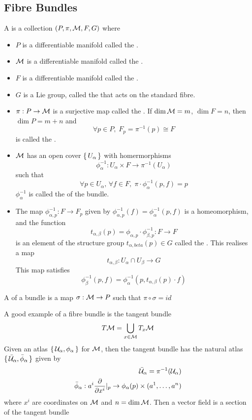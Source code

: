 \documentclass{article}
\begin{document}
\subsection{Fibre Bundles}

\begin{definition}
A  is a collection $(P,\pi,\mathcal{M},F,G)$ where
\begin{itemize}
    \item $P$ is a differentiable manifold called the .
    \item $\mathcal{M}$ is a differentiable manifold called the .
    \item $F$ is a differentiable manifold called the .
    \item $G$ is a Lie group, called the  that acts on the standard fibre.
    \item $\pi:P\to\mathcal{M}$ is a surjective map called the . If $\dim\mathcal{M} = m$, $\dim F = n$, then $\dim P = m+n$ and \[
    \forall p\in P, \; F_p = \pi^{-1}(p) \cong F
    \]
    is called the .
    \item $\mathcal{M}$ has an open cover $\set{U_\alpha}$ with homermorphisms
    \[
    \phi_\alpha^{-1}: U_\alpha \times F \to \pi^{-1}(U_\alpha)
    \]
    such that 
    \[
    \forall p\in U_\alpha, \, \forall f \in F, \; \pi\cdot\phi_\alpha^{-1}(p,f) = p
    \]
    $\phi_\alpha^{-1}$ is called the  of the bundle.
    \item The map $\phi_{\alpha,p}^{-1} : F\to F_p$ given by $\phi_{\alpha,p}^{-1}(f) = \phi_\alpha^{-1}(p,f)$ is a homeomorphism, and the function 
    \[
    t_{\alpha,\beta}(p) = \phi_{\alpha,p} \cdot \phi_{\beta,p}^{-1} : F \to F
    \]
    is an element of the structure group $t_{\alpha,beta}(p)\in G$ called the . This realises a map 
    \[
    t_{\alpha,\beta} : U_\alpha \cap U_\beta \to G 
    \]
    This map satisfies 
    \[
    \phi_\beta^{-1}(p,f) = \phi_\alpha^{-1} (p, t_{\alpha,\beta}(p) \cdot f )
    \]
    \end{itemize}
\end{definition}

\begin{definition}
A  of a bundle is a map $\sigma:\mathcal{M}\to P$ such that $\pi\circ\sigma=id$
\end{definition}

\begin{example}
A good example of a fibre bundle is the tangent bundle
\[
T\mathcal{M} = \bigcup_{x\in\mathcal{M}} T_x \mathcal{M}
\]
Given an atlas $\set{\mathcal{U}_\alpha, \phi_\alpha}$ for $\mathcal{M}$, then the tangent bundle has the natural atlas $\set{\bar{\mathcal{U}}_\alpha, \bar{\phi}_\alpha}$ given by 
\begin{align*}
\bar{\mathcal{U}}_\alpha = \pi^{-1}(\mathcal{U}_\alpha) \\
\bar{\phi}_\alpha : a^i \frac{\partial}{\partial x^i} \rvert_p \to \phi_\alpha(p) \times (a^1,\dots,a^n)
\end{align*}
where $x^i$ are coordinates on $\mathcal{M}$ and $n=\dim\mathcal{M}$. Then a vector field is a section of the tangent bundle
\end{example}
\end{document}
